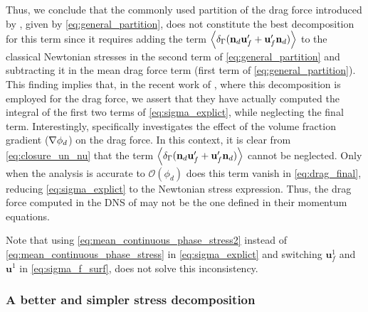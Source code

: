 Thus, we conclude that the commonly used partition of the drag force introduced by \citet{zhzhang1997momentum,jackson2000}, given by \ref{eq:general_partition}, does not constitute the best decomposition for this term since it requires adding the term  $\left<\delta_\Gamma (\textbf{n}_d \textbf{u}_f'+  \textbf{u}_f' \textbf{n}_d)\right>$ to the classical Newtonian stresses in the second term of \ref{eq:general_partition} and subtracting it in the mean drag force term (first term of \ref{eq:general_partition}). 
This finding implies that, in the recent work of \citet{wang2021numerical, wang2024effect}, where this decomposition is employed for the drag force, we assert that they have actually computed the integral of the first two terms of \ref{eq:sigma_explict}, while neglecting the final term. 
Interestingly, \citet{wang2024effect} specifically investigates the effect of the volume fraction gradient ($\mathbf{\nabla} \phi_d$) on the drag force. 
In this context, it is clear from \eqref{eq:closure_un_nu} that the term $\left<\delta_\Gamma (\textbf{n}_d \textbf{u}_f'+  \textbf{u}_f' \textbf{n}_d)\right>$ cannot be neglected. 
Only when the analysis is accurate to $\mathcal{O}(\phi_d)$ does this term vanish in \ref{eq:drag_final}, reducing \ref{eq:sigma_explict} to the Newtonian stress expression. 
Thus, the drag force computed in the DNS of \citet{wang2024effect} may not be the one defined in their momentum equations. 

Note that using \ref{eq:mean_continuous_phase_stress2} instead of \ref{eq:mean_continuous_phase_stress} in \ref{eq:sigma_explict} and switching $\textbf{u}_f^1$ and $\textbf{u}^1$ in \ref{eq:sigma_f_surf}, does not solve this inconsistency. 

\subsubsection{A better and simpler stress decomposition}

